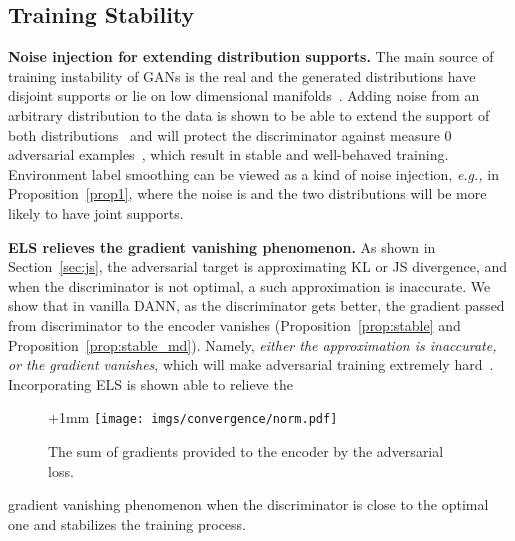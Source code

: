 \documentclass{article} \usepackage{iclr2023_conference,times}
\newcommand{\ls}[0]{ELS\xspace}
\newcommand{\eg}[0]{\textit{e.g., }}
\begin{document}
\vspace{-0.1cm}
\subsection{Training Stability}\label{sec:stable}
\vspace{-0.1cm}

\textbf{Noise injection for extending distribution supports.} The main source of training instability of GANs is the real and the generated distributions have disjoint supports or lie on low dimensional manifolds~\citep{arjovsky2017towards,roth2017stabilizing}. Adding noise from an arbitrary distribution to the data is shown to be able to extend the support of both distributions~\citep{jenni2019stabilizing,arjovsky2017towards,sonderby2016amortised} and will protect the discriminator against measure 0 adversarial examples~\citep{jenni2019stabilizing}, which result in stable and well-behaved training. Environment label smoothing can be viewed as a kind of noise injection, \eg in Proposition~\ref{prop1},  where the noise is  and the two distributions will be more likely to have joint supports. 


\textbf{\ls relieves the gradient vanishing phenomenon.} As shown in Section~\ref{sec:js}, the adversarial target is approximating KL or JS divergence, and when the discriminator is not optimal, a such approximation is inaccurate. We show that in vanilla DANN, as the discriminator gets better, the gradient passed from discriminator to the encoder vanishes (Proposition~\ref{prop:stable} and Proposition~\ref{prop:stable_md}). Namely, \textit{either the approximation is inaccurate, or the gradient vanishes}, which will make adversarial training extremely hard~\citep{arjovsky2017towards}. Incorporating \ls is shown able to relieve the 
\begin{wrapfigure}{r}{0.3\textwidth}
  \begin{center}
  \advance\leftskip+1mm
  \renewcommand{\captionlabelfont}{\footnotesize}
    \vspace{-0.15in}  
    \texttt{[image: imgs/convergence/norm.pdf]}
    \vspace{-0.2in} 
    \caption{The sum of gradients provided to the encoder by the adversarial loss.}
    \label{fig:gradient_norm}
    \vspace{-0.4in} 
  \end{center}
\end{wrapfigure}
gradient vanishing phenomenon when the discriminator is close to the optimal one and stabilizes the training process.
\end{document}
